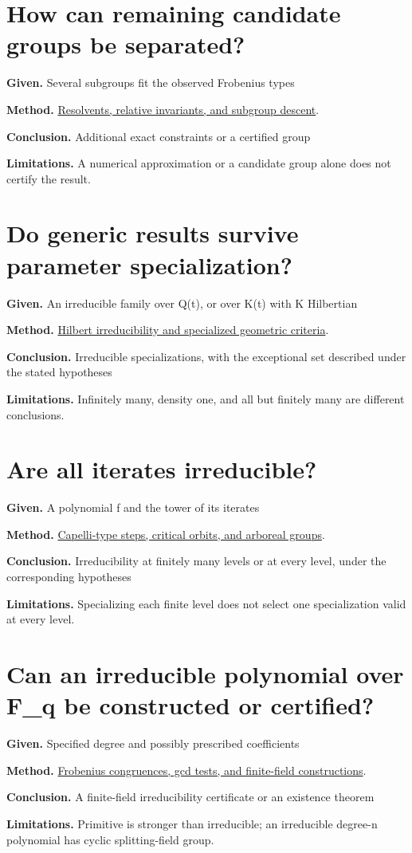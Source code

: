 \documentclass[11pt,a4paper,oneside,openany]{book}
\begin{document}
\section*{How can remaining candidate groups be separated?}
\textbf{Given.} Several subgroups fit the observed Frobenius types\par
\textbf{Method.} \hyperlink{article:resolvents}{Resolvents, relative invariants, and subgroup descent}.\par
\textbf{Conclusion.} Additional exact constraints or a certified group\par
\textbf{Limitations.} A numerical approximation or a candidate group alone does not certify the result.\par\medskip
\section*{Do generic results survive parameter specialization?}
\textbf{Given.} An irreducible family over Q(t), or over K(t) with K Hilbertian\par
\textbf{Method.} \hyperlink{article:specialization}{Hilbert irreducibility and specialized geometric criteria}.\par
\textbf{Conclusion.} Irreducible specializations, with the exceptional set described under the stated hypotheses\par
\textbf{Limitations.} Infinitely many, density one, and all but finitely many are different conclusions.\par\medskip
\section*{Are all iterates irreducible?}
\textbf{Given.} A polynomial f and the tower of its iterates\par
\textbf{Method.} \hyperlink{article:composition-iteration}{Capelli-type steps, critical orbits, and arboreal groups}.\par
\textbf{Conclusion.} Irreducibility at finitely many levels or at every level, under the corresponding hypotheses\par
\textbf{Limitations.} Specializing each finite level does not select one specialization valid at every level.\par\medskip
\section*{Can an irreducible polynomial over F\_\allowbreak{}q be constructed or certified?}
\textbf{Given.} Specified degree and possibly prescribed coefficients\par
\textbf{Method.} \hyperlink{article:finite-field-irreducibility}{Frobenius congruences, gcd tests, and finite-field constructions}.\par
\textbf{Conclusion.} A finite-field irreducibility certificate or an existence theorem\par
\textbf{Limitations.} Primitive is stronger than irreducible; an irreducible degree-n polynomial has cyclic splitting-field group.\par\medskip
\end{document}
